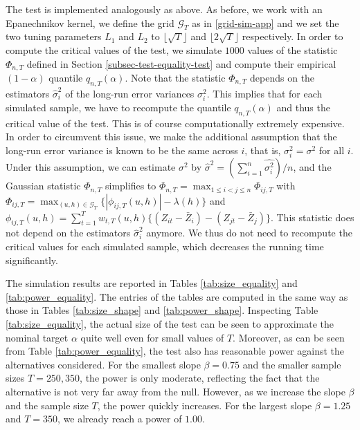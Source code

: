The test is implemented analogously as above. As before, we work with an Epanechnikov kernel, we define the grid $\mathcal{G}_T$ as in \eqref{grid-sim-app} and we set the two tuning parameters $L_1$ and $L_2$ to $\lfloor \sqrt{T} \rfloor$ and $\lfloor 2\sqrt{T} \rfloor$ respectively. In order to compute the critical values of the test, we simulate $1000$ values of the statistic $\Phi_{n,T}$ defined in Section \ref{subsec-test-equality-test} and compute their empirical $(1-\alpha)$ quantile $q_{n,T}(\alpha)$. Note that the statistic $\Phi_{n,T}$ depends on the estimators $\widehat{\sigma}_i^2$ of the long-run error variances $\sigma_i^2$. This implies that for each simulated sample, we have to recompute the quantile $q_{n,T}(\alpha)$ and thus the critical value of the test. This is of course computationally extremely expensive. In order to circumvent this issue, we make the additional assumption that the long-run error variance is known to be the same across $i$, that is, $\sigma_i^2 = \sigma^2$ for all $i$. Under this assumption, we can estimate $\sigma^2$ by $\widehat{\sigma}^2 = (\sum_{i = 1}^n\widehat{\sigma_i^2})/n$, and the Gaussian statistic $\Phi_{n,T}$ simplifies to $\Phi_{n,T} = \max_{1 \le i < j \le n} \Phi_{ij,T}$ with $\Phi_{ij,T} = \max_{(u,h) \in \mathcal{G}_T} \{ | \phi_{ij,T}(u,h)| - \lambda(h) \}$ and $\phi_{ij,T}(u,h) = \sum_{t=1}^T w_{t,T}(u,h) \{ (Z_{it} - \bar{Z}_i) - (Z_{jt} - \bar{Z}_j)\}$. This statistic does not depend on the estimators $\widehat{\sigma}_i^2$ anymore. We thus do not need to recompute the critical values for each simulated sample, which decreases the running time significantly.


The simulation results are reported in Tables \ref{tab:size_equality} and \ref{tab:power_equality}. The entries of the tables are computed in the same way as those in Tables \ref{tab:size_shape} and \ref{tab:power_shape}. Inspecting Table \ref{tab:size_equality}, the actual size of the test can be seen to approximate the nominal target $\alpha$ quite well even for small values of $T$. Moreover, as can be seen from Table \ref{tab:power_equality}, the test also has reasonable power against the alternatives considered. For the smallest slope $\beta=0.75$ and the smaller sample sizes $T = 250, 350$, the power is only moderate, reflecting the fact that the alternative is not very far away from the null. However, as we increase the slope $\beta$ and the sample size $T$, the power quickly increases. For the largest slope $\beta = 1.25$ and $T=350$, we already reach a power of $1.00$.


